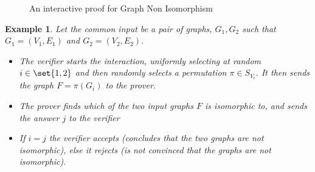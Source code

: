 \documentclass{article}
\newtheorem{example}{Example}
\begin{document}
\begin{figure}[H]
    \centering
    \caption{An interactive proof for Graph Non Isomorphism}
    \label{graphnonisomorphism}
\end{figure}

\begin{example}
    Let the common input be a pair of graphs, $G_1, G_2$ such that $G_1 = (V_1, E_1)$ and $G_2 = (V_2, E_2)$.
    \begin{itemize}
        \item The verifier starts the interaction, uniformly selecting at random $i \in \set{1, 2}$ and then randomly selects a permutation $\pi \in S_{V_i}$.
              It then sends the graph $F = \pi(G_i)$ to the prover.
        \item The prover finds which of the two input graphs $F$ is isomorphic to, and sends the answer $j$ to the verifier
        \item If $i = j$ the verifier accepts (concludes that the two graphs are not isomorphic), else it rejects (is not convinced that the graphs are not isomorphic).
    \end{itemize}
\end{example}
\end{document}
